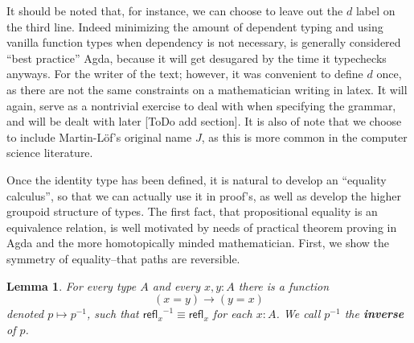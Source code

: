 \documentclass[11pt, a4paper]{article}
\newtheorem{lem}{Lemma}
\newcommand{\jdeq}{\equiv}      %
\newcommand{\refl}[1]{\ensuremath{\mathsf{refl}_{#1}}\xspace}
\newcommand{\define}[1]{\textbf{#1}}
\newcommand{\opp}[1]{\mathord{{#1}^{-1}}}
\begin{document}
It should be noted that, for instance, we can choose to leave out the $d$ label
on the third line. Indeed minimizing the amount of dependent typing and using
vanilla function types when dependency is not necessary, is generally
considered ``best practice'' Agda, because it will get desugared by the time it
typechecks anyways. For the writer of the text; however, it was convenient to
define $d$ once, as there are not the same constraints on a mathematician
writing in latex. It will again, serve as a nontrivial exercise to deal with
when specifying the grammar, and will be dealt with later [ToDo add section].
It is also of note that we choose to include Martin-Löf's original name $J$, as
this is more common in the computer science literature.

Once the identity type has been defined, it is natural to develop an ``equality
calculus'',  so that we can actually use it in proof's, as well as develop the
higher groupoid structure of types. The first fact, that propositional equality
is an equivalence relation, is well motivated by needs of practical theorem
proving in Agda and the more homotopically minded mathematician. First, we show the symmetry of equality--that paths are reversible.

\begin{lem}\label{lem:opp}
  For every type $A$ and every $x,y:A$ there is a function
  \begin{equation*}
    (x= y)\to(y= x)
  \end{equation*}
  denoted $p\mapsto \opp{p}$, such that $\opp{\refl{x}}\jdeq\refl{x}$ for each $x:A$.
  We call $\opp{p}$ the \define{inverse} of $p$.
\end{lem}
\end{document}
